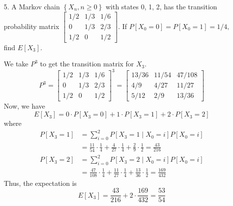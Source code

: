 \documentclass{article}
\begin{document}
\begin{itemize}
	\item[5.] A Markov chain $\left\{ X_n, n\ge 0 \right\}$ with states 0, 1, 2, has the transition probability matrix $\begin{bmatrix}
			1/2 & 1/3 & 1/6 \\ 0 & 1/3 & 2/3 \\ 1/2 & 0 & 1/2
		\end{bmatrix}.$ If $P[X_0=0]=P[X_0=1]=1/4,$ find $E[X_3].$
		\begin{soln}
			We take $P^3$ to get the transition matrix for $X_3.$
			\[P^3 = \begin{bmatrix}
					1/2 & 1/3 & 1/6 \\ 0 & 1/3 & 2/3 \\ 1/2 & 0 & 1/2
				\end{bmatrix}^3 = \begin{bmatrix}
					13/36 & 11/54 & 47/108 \\
					4/9 & 4/27 & 11/27 \\
					5/12 & 2/9 & 13/36
			\end{bmatrix}\]
			Now, we have
			\[E[X_3]=0\cdot P[X_3=0] + 1\cdot P[X_3=1] + 2\cdot P[X_3=2]\]
			where
			\begin{align*}
				P[X_3=1] &= \sum_{i=0}^{2}P[X_3=1\mid X_0=i]P[X_0=i] \\
				&= \frac{11}{54}\cdot \frac{1}{4} + \frac{4}{27}\cdot\frac{1}{4} + \frac{2}{9}\cdot\frac{1}{2} = \frac{43}{216} \\
				P[X_3=2] &= \sum_{i=0}^{2}P[X_3=2\mid X_0=i]P[X_0=i] \\
				&= \frac{47}{108}\cdot\frac{1}{4} + \frac{11}{27}\cdot\frac{1}{4} + \frac{13}{36}\cdot\frac{1}{2} = \frac{169}{432}
			\end{align*}
			Thus, the expectation is
			\[E[X_3] = \frac{43}{216} + 2\cdot\frac{169}{432} = \frac{53}{54}\]
		\end{soln}


\end{itemize}
\end{document}
